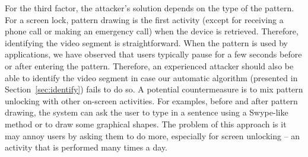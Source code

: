 For the third factor, the attacker's solution depends on the type of the
pattern. For a screen lock, pattern drawing is the first activity (except for
receiving a phone call or making an emergency call) when the device is
retrieved. Therefore, identifying the video segment is straightforward. When
the pattern is used by applications, we have observed that users typically
pause for a few seconds before or after entering the pattern. Therefore, an
experienced attacker should also be able to identify the video segment in
case our automatic algorithm (presented in Section~\ref{sec:identify}) fails
to do so. A potential countermeasure is to mix pattern unlocking with other
on-screen activities. For examples, before and after pattern drawing, the
system can ask the user to type in a sentence using a Swype-like method or to
draw some graphical shapes. The problem of this approach is it may annoy
users by asking them to do more, especially for screen unlocking -- an
activity that is performed
many times a day.


